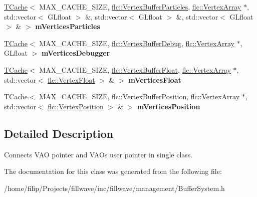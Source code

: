 \begin{DoxyCompactItemize}
\item 
\hyperlink{classflw_1_1flf_1_1TCache}{T\+Cache}$<$ M\+A\+X\+\_\+\+C\+A\+C\+H\+E\+\_\+\+S\+I\+ZE, \hyperlink{classflw_1_1flc_1_1VertexBufferParticles}{flc\+::\+Vertex\+Buffer\+Particles}, \hyperlink{classflw_1_1flc_1_1VertexArray}{flc\+::\+Vertex\+Array} $\ast$, std\+::vector$<$ G\+Lfloat $>$ \&, std\+::vector$<$ G\+Lfloat $>$ \&, std\+::vector$<$ G\+Lfloat $>$ \& $>$ {\bfseries m\+Vertices\+Particles}\hypertarget{structflw_1_1flf_1_1BufferSystem_a75dd883faa9d491424ab2a8dcb75abee}{}\label{structflw_1_1flf_1_1BufferSystem_a75dd883faa9d491424ab2a8dcb75abee}

\item 
\hyperlink{classflw_1_1flf_1_1TCache}{T\+Cache}$<$ M\+A\+X\+\_\+\+C\+A\+C\+H\+E\+\_\+\+S\+I\+ZE, \hyperlink{classflw_1_1flc_1_1VertexBufferDebug}{flc\+::\+Vertex\+Buffer\+Debug}, \hyperlink{classflw_1_1flc_1_1VertexArray}{flc\+::\+Vertex\+Array} $\ast$, G\+Lfloat $>$ {\bfseries m\+Vertices\+Debugger}\hypertarget{structflw_1_1flf_1_1BufferSystem_a36720b705108842100c58f19793c3878}{}\label{structflw_1_1flf_1_1BufferSystem_a36720b705108842100c58f19793c3878}

\item 
\hyperlink{classflw_1_1flf_1_1TCache}{T\+Cache}$<$ M\+A\+X\+\_\+\+C\+A\+C\+H\+E\+\_\+\+S\+I\+ZE, \hyperlink{classflw_1_1flc_1_1VertexBufferFloat}{flc\+::\+Vertex\+Buffer\+Float}, \hyperlink{classflw_1_1flc_1_1VertexArray}{flc\+::\+Vertex\+Array} $\ast$, std\+::vector$<$ \hyperlink{structflw_1_1flc_1_1VertexFloat}{flc\+::\+Vertex\+Float} $>$ \& $>$ {\bfseries m\+Vertices\+Float}\hypertarget{structflw_1_1flf_1_1BufferSystem_a315fe65dc1c97c15215d09627a4d3463}{}\label{structflw_1_1flf_1_1BufferSystem_a315fe65dc1c97c15215d09627a4d3463}

\item 
\hyperlink{classflw_1_1flf_1_1TCache}{T\+Cache}$<$ M\+A\+X\+\_\+\+C\+A\+C\+H\+E\+\_\+\+S\+I\+ZE, \hyperlink{classflw_1_1flc_1_1VertexBufferPosition}{flc\+::\+Vertex\+Buffer\+Position}, \hyperlink{classflw_1_1flc_1_1VertexArray}{flc\+::\+Vertex\+Array} $\ast$, std\+::vector$<$ \hyperlink{structflw_1_1flc_1_1VertexPosition}{flc\+::\+Vertex\+Position} $>$ \& $>$ {\bfseries m\+Vertices\+Position}\hypertarget{structflw_1_1flf_1_1BufferSystem_aa90f229de2f3f3237ae6328d170b9dd0}{}\label{structflw_1_1flf_1_1BufferSystem_aa90f229de2f3f3237ae6328d170b9dd0}

\end{DoxyCompactItemize}


\subsection{Detailed Description}
Connects V\+AO pointer and V\+AO\textquotesingle{}s user pointer in single class. 

The documentation for this class was generated from the following file\+:\begin{DoxyCompactItemize}
\item 
/home/filip/\+Projects/fillwave/inc/fillwave/management/Buffer\+System.\+h\end{DoxyCompactItemize}
